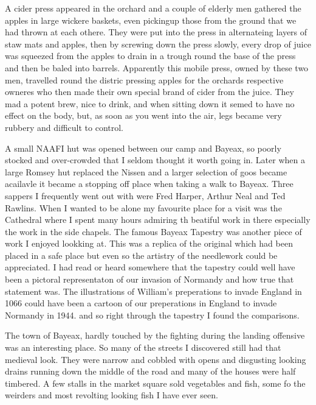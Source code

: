 A cider press appeared in the orchard and a couple of elderly men
gathered the apples in large wickere baskets, even pickingup those
from the ground that we had thrown at each othere. They were put into
the press in alternateing layers of staw mats and apples, then by
screwing down the press slowly, every drop of juice was squeezed from
the apples to drain in a trough round the base of the press and then
be baled into barrels. Apparently this mobile press, owned by these
two men, travelled round the distric pressing apples for the orchards
respective owneres who then made their own special brand of cider from
the juice. They mad a potent brew, nice to drink, and when sitting
down it semed to have no effect on the body, but, as soon as you went
into the air, legs became very rubbery and difficult to control.

A small NAAFI hut was opened between our camp and Bayeax, so poorly
stocked and over-crowded that I seldom thought it worth going
in. Later when a large Romsey hut replaced the Nissen and a larger
selection of goos became acailavle it became a stopping off place when
taking a walk to Bayeax. Three sappers I frequently went out with were
Fred Harper, Arthur Neal and Ted Rawlins. When I wanted to be alone my
favourite place for a visit was the Cathedral where I spent many hours
admiring th beatiful work in there especially the work in the side
chapels. The famous Bayeax Tapestry was another piece of work I
enjoyed lookking at. This was a replica of the original which had been
placed in a safe place but even so the artistry of the needlework
could be appreciated. I had read or heard somewhere that the tapestry
could well have been a pictoral representaton of our invasion of
Normandy and how true that statement was. The illustrations of
William's preperations to invade England in 1066 could have been a
cartoon of our preperations in England to invade Normandy in 1944. and
so right through the tapestry I found the comparisons.

The town of Bayeax, hardly touched by the fighting during the landing
offensive was an interesting place. So many of the streets I
discovered still had that medieval look. They were narrow and cobbled
with opens and disgusting looking drains running down the middle of
the road and many of the houses were half timbered. A few stalls in
the market square sold vegetables and fish, some fo the weirders and
most revolting looking fish I have ever seen.


